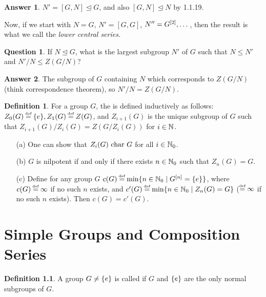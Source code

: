 \documentclass[11pt]{book}
\newcounter{counter}
\theoremstyle{definition}   \newtheorem{defn}[counter]{Definition} %
\newtheorem*{question}{Question}   \newtheorem*{answer}{Answer}   \newtheorem{modification}[counter]{Modification}   \newtheorem{numitem}[counter]{}
\newcommand{\nsg}{\mathrel{\unlhd}}   \newcommand{\ind}{\parindent24pt}   \newcommand{\vn}{\varnothing}
\newcommand\myeq{\mathrel{\overset{\makebox[0pt]{\mbox{\normalfont\tiny\sffamily \textrm{def}}}}{=}}}
\newcommand{\vs}{\vspace{8pt}}
\numberwithin{counter}{chapter}
\begin{document}
\begin{answer}
$N' = [G,N] \nsg G$, and also $[G,N] \nsg N$ by 1.1.19.
\end{answer}

\vs

Now, if we start with $N=G$, $N' = [G,G]$, $N'' = G^{[2]}, \dots$, then the result is what we call the \textit{lower central series.}

\vs

\begin{question}
If $N \nsg G$, what is the largest subgroup $N'$ of $G$ such that $N \leq N'$ and $N'/N \leq Z(G/N)$?
\end{question}

\begin{answer}
The subgroup of $G$ containing $N$ which corresponds to $Z(G/N)$ (think correspondence theorem), so $N'/N = Z(G/N)$.
\end{answer}

\vs

\begin{defn}
For a group $G$, the  is defined inductively as follows: $Z_0(G) \myeq \triv, Z_1(G) \myeq Z(G)$, and $Z_{i+1}(G)$ is the unique subgroup of $G$ such that  $Z_{i+1}(G)/Z_i(G) = Z(G/Z_i(G))$ for $i \in \operatorname{\mathbb{N}}$.
\end{defn}

\vs

\begin{remark}
\begin{enumerate}\
\item[(a)] One can show that $Z_i(G) \textnormal{ char } G$ for all $i \in \operatorname{\mathbb{N}}_0$.
\item[(b)] $G$ is nilpotent if and only if there exists $n \in \operatorname{\mathbb{N}}_0$ such that $Z_n(G) = G$.
\item[(c)] Define for any group $G$ $c(G) \myeq \min \{n \in \N_0 \mid \lcs{G}{n} = \triv \}$, where $c(G) \myeq \infty$ if no such $n$ exists, and $c'(G) \myeq \min\{n \in \N_0 \mid Z_n(G) = G\}$ ($\myeq \infty$ if no such $n$ exists). Then $c(G) = c'(G)$.
\end{enumerate}
\end{remark}



\chapter{Simple Groups and Composition Series}

\begin{defn}
A group $G \ne \{e\}$ is called  if $G$ and $\{e\}$ are the only normal subgroups of $G$.
\end{defn}
\end{document}
